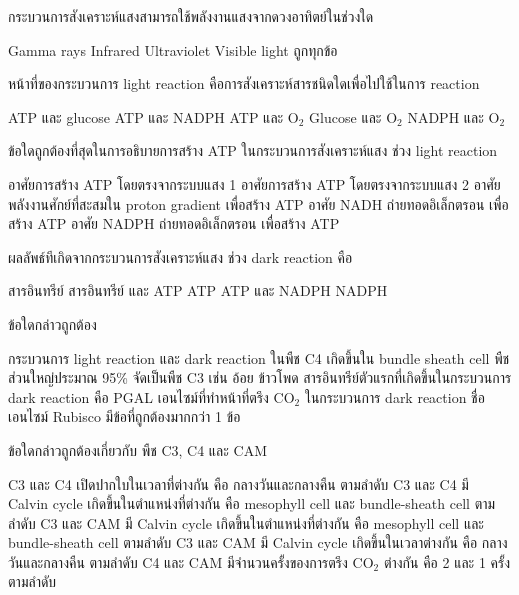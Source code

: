 \begin{questions}
\filbreak
  \question กระบวนการสังเคราะห์แสงสามารถใช้พลังงานแสงจากดวงอาทิตย์ในช่วงใด
  \begin{choices}
    \choice Gamma rays
    \choice Infrared
    \choice Ultraviolet
    \choice Visible light
    \choice ถูกทุกข้อ
\end{choices}

\filbreak
  \question หน้าที่ของกระบวนการ light reaction คือการสังเคราะห์สารชนิดใดเพื่อไปใช้ในการ reaction
  \begin{choices}
    \choice ATP และ glucose
    \choice ATP และ NADPH
    \choice ATP และ O$_2$
    \choice Glucose และ O$_2$
    \choice NADPH และ O$_2$
\end{choices}

\filbreak
  \question ข้อใดถูกต้องที่สุดในการอธิบายการสร้าง ATP ในกระบวนการสังเคราะห์แสง ช่วง light reaction
  \begin{choices}
    \choice อาศัยการสร้าง ATP โดยตรงจากระบบแสง 1
    \choice อาศัยการสร้าง ATP โดยตรงจากระบบแสง 2
    \choice อาศัยพลังงานศักย์ที่สะสมใน proton gradient เพื่อสร้าง ATP
    \choice อาศัย NADH ถ่ายทอดอิเล็กตรอน เพื่อสร้าง ATP
    \choice อาศัย NADPH ถ่ายทอดอิเล็กตรอน เพื่อสร้าง ATP
\end{choices}

\filbreak
  \question ผลลัพธ์ทีเกิดจากกระบวนการสังเคราะห์แสง ช่วง dark reaction คือ
  \begin{choices}
    \choice สารอินทรีย์
    \choice สารอินทรีย์ และ ATP
    \choice ATP
    \choice ATP และ NADPH
    \choice NADPH
\end{choices}

\filbreak
  \question ข้อใดกล่าวถูกต้อง
  \begin{choices}
    \choice กระบวนการ light reaction และ dark reaction ในพืช C4 เกิดขึ้นใน bundle sheath cell
    \choice พืชส่วนใหญ่ประมาณ 95\% จัดเป็นพืช C3 เช่น อ้อย ข้าวโพด
    \choice สารอินทรีย์ตัวแรกที่เกิดขึ้นในกระบวนการ dark reaction คือ PGAL
    \choice เอนไซม์ที่ทำหน้าที่ตรึง CO$_2$ ในกระบวนการ dark reaction ชื่อ เอนไซม์ Rubisco
    \choice มีข้อที่ถูกต้องมากกว่า 1 ข้อ
\end{choices}

\filbreak
  \question ข้อใดกล่าวถูกต้องเกี่ยวกับ พืช C3, C4 และ CAM
  \begin{choices}
    \choice C3 และ C4 เปิดปากใบในเวลาที่ต่างกัน คือ กลางวันและกลางคืน ตามลำดับ
    \choice C3 และ C4 มี Calvin cycle เกิดขึ้นในตำแหน่งที่ต่างกัน คือ mesophyll cell และ bundle-sheath cell ตามลำดับ
    \choice C3 และ CAM มี Calvin cycle เกิดขึ้นในตำแหน่งที่ต่างกัน คือ mesophyll cell และ bundle-sheath cell ตามลำดับ
    \choice C3 และ CAM มี Calvin cycle เกิดขึ้นในเวลาต่างกัน คือ กลางวันและกลางคืน ตามลำดับ
    \choice C4 และ CAM มีจำนวนครั้งของการตรึง CO$_2$ ต่างกัน คือ 2 และ 1 ครั้ง ตามลำดับ
\end{choices}


\end{questions}
